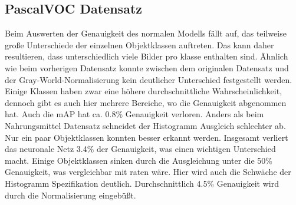 \documentclass[a4paper,12pt,oneside]{article}
\begin{document}
\subsection{PascalVOC Datensatz}
Beim Auswerten der Genauigkeit des normalen Modells fällt auf, das teilweise große Unterschiede der einzelnen Objektklassen auftreten. Das kann daher resultieren, dass unterschiedlich viele Bilder pro klasse enthalten sind. Ähnlich wie beim vorherigen Datensatz konnte zwischen dem originalen Datensatz und der Gray-World-Normalisierung kein deutlicher Unterschied festgestellt werden. Einige Klassen haben zwar eine höhere durchschnittliche Wahrscheinlichkeit, dennoch gibt es auch hier mehrere Bereiche, wo die Genauigkeit abgenommen hat. Auch die mAP hat ca. 0.8\% Genauigkeit verloren. Anders als beim Nahrungsmittel Datensatz schneidet der Histogramm Ausgleich schlechter ab. Nur ein paar Objektklassen konnten besser erkannt werden. Insgesamt verliert das neuronale Netz 3.4\% der Genauigkeit, was einen wichtigen Unterschied macht. Einige Objektklassen sinken durch die Ausgleichung unter die 50\% Genauigkeit, was vergleichbar mit raten wäre. Hier wird auch die Schwäche der Histogramm Spezifikation deutlich. Durchschnittlich 4.5\% Genauigkeit wird durch die Normalisierung eingebüßt. 
\end{document}
